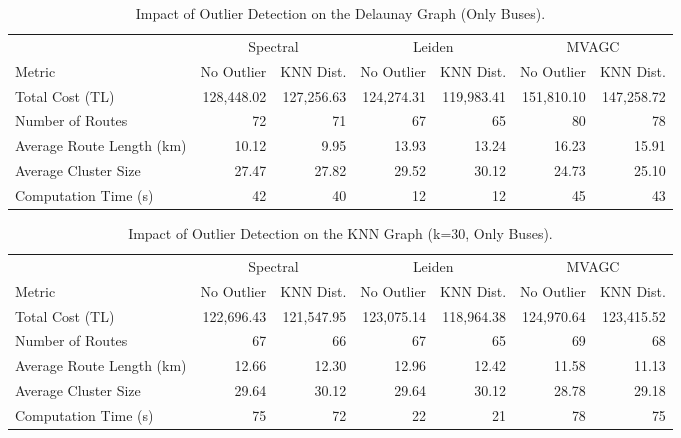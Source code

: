 \begin{table}[h]
\centering
\scriptsize{
\setlength{\tabcolsep}{4pt}
\begin{tabular}{lrrrrrr}
\toprule
& \multicolumn{2}{c}{Spectral} & \multicolumn{2}{c}{Leiden} & \multicolumn{2}{c}{MVAGC} \\
\cmidrule(lr){2-3} \cmidrule(lr){4-5} \cmidrule(lr){6-7}
Metric & No Outlier & KNN Dist. & No Outlier & KNN Dist. & No Outlier & KNN Dist. \\
\midrule
Total Cost (TL) & 128,448.02 & 127,256.63 & 124,274.31 & 119,983.41 & 151,810.10 & 147,258.72 \\
Number of Routes & 72 & 71 & 67 & 65 & 80 & 78 \\
Average Route Length (km) & 10.12 & 9.95 & 13.93 & 13.24 & 16.23 & 15.91 \\
Average Cluster Size & 27.47 & 27.82 & 29.52 & 30.12 & 24.73 & 25.10 \\
Computation Time (s) & 42 & 40 & 12 & 12 & 45 & 43 \\
\bottomrule
\end{tabular}
}
\caption{Impact of Outlier Detection on the Delaunay Graph (Only Buses).}
\label{tab:outlier_delaunay_results}
\end{table}

\begin{table}[h]
\centering
\scriptsize{
\setlength{\tabcolsep}{4pt}
\begin{tabular}{lrrrrrr}
\toprule
& \multicolumn{2}{c}{Spectral} & \multicolumn{2}{c}{Leiden} & \multicolumn{2}{c}{MVAGC} \\
\cmidrule(lr){2-3} \cmidrule(lr){4-5} \cmidrule(lr){6-7}
Metric & No Outlier & KNN Dist. & No Outlier & KNN Dist. & No Outlier & KNN Dist. \\
\midrule
Total Cost (TL) & 122,696.43 & 121,547.95 & 123,075.14 & 118,964.38 & 124,970.64 & 123,415.52 \\
Number of Routes & 67 & 66 & 67 & 65 & 69 & 68 \\
Average Route Length (km) & 12.66 & 12.30 & 12.96 & 12.42 & 11.58 & 11.13 \\
Average Cluster Size & 29.64 & 30.12 & 29.64 & 30.12 & 28.78 & 29.18 \\
Computation Time (s) & 75 & 72 & 22 & 21 & 78 & 75 \\ 
\bottomrule
\end{tabular}
}
\caption{Impact of Outlier Detection on the KNN Graph (k=30, Only Buses).}
\label{tab:outlier_knn_results}
\end{table}

